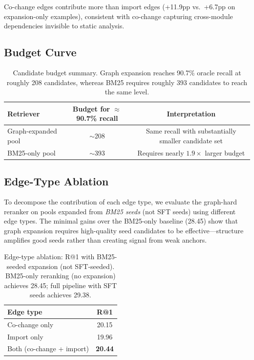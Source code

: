 \documentclass{article}
\begin{document}
Co-change edges contribute more than import edges (+11.9pp vs.\ +6.7pp on expansion-only examples), consistent with co-change capturing cross-module dependencies invisible to static analysis.


\subsection{Budget Curve}
\label{app:budget}

\begin{table}[h]
\centering
\caption{Candidate budget summary. Graph expansion reaches 90.7\% oracle recall at roughly 208 candidates, whereas BM25 requires roughly 393 candidates to reach the same level.}
\label{fig:budget_curve}
\small
\begin{tabular}{lcc}
\toprule
\textbf{Retriever} & \textbf{Budget for $\approx$90.7\% recall} & \textbf{Interpretation} \\
\midrule
Graph-expanded pool & $\sim$208 & Same recall with substantially smaller candidate set \\
BM25-only pool & $\sim$393 & Requires nearly $1.9\times$ larger budget \\
\bottomrule
\end{tabular}
\end{table}


\subsection{Edge-Type Ablation}
\label{app:edge_type}

To decompose the contribution of each edge type, we evaluate the graph-hard reranker on pools expanded from \emph{BM25 seeds} (not SFT seeds) using different edge types.
The minimal gains over the BM25-only baseline (28.45) show that graph expansion requires high-quality seed candidates to be effective---structure amplifies good seeds rather than creating signal from weak anchors.

\begin{table}[h]
\centering
\caption{Edge-type ablation: R@1 with BM25-seeded expansion (not SFT-seeded). BM25-only reranking (no expansion) achieves 28.45; full pipeline with SFT seeds achieves 29.38.}
\label{tab:edge_type}
\small
\begin{tabular}{lc}
\toprule
\textbf{Edge type} & \textbf{R@1} \\
\midrule
Co-change only & 20.15 \\
Import only & 19.96 \\
Both (co-change + import) & \textbf{20.44} \\
\bottomrule
\end{tabular}
\end{table}
\end{document}
